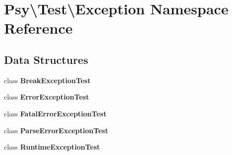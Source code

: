 \section{Psy\textbackslash{}Test\textbackslash{}Exception Namespace Reference}
\label{namespace_psy_1_1_test_1_1_exception}
\subsection*{Data Structures}
\begin{DoxyCompactItemize}
\item 
class {\bf Break\+Exception\+Test}
\item 
class {\bf Error\+Exception\+Test}
\item 
class {\bf Fatal\+Error\+Exception\+Test}
\item 
class {\bf Parse\+Error\+Exception\+Test}
\item 
class {\bf Runtime\+Exception\+Test}
\end{DoxyCompactItemize}

